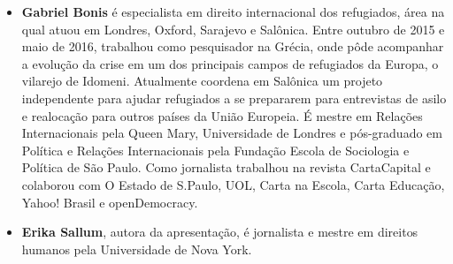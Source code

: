 \begin{itemize}


\item \textbf{Gabriel Bonis} 
  é especialista em direito internacional dos refugiados, área na
  qual atuou em Londres, Oxford, Sarajevo e Salônica. Entre outubro de 2015 e
  maio de 2016, trabalhou como pesquisador na Grécia, onde pôde acompanhar a evolução da crise
  em um dos principais campos de refugiados da Europa, o vilarejo de Idomeni.
  Atualmente coordena em Salônica um projeto independente para ajudar
  refugiados a se prepararem para entrevistas de asilo e realocação para outros
  países da União Europeia. É mestre em Relações Internacionais pela Queen
  Mary, Universidade de Londres e pós-graduado em Política e Relações
  Internacionais pela Fundação Escola de Sociologia e Política de São Paulo.
  Como jornalista trabalhou na revista CartaCapital e colaborou com O Estado de
  S.Paulo, UOL, Carta na Escola, Carta Educação, Yahoo! Brasil e openDemocracy.
  
\item \textbf{Erika Sallum}, autora da apresentação, é jornalista e mestre em direitos humanos pela Universidade de Nova York. 
\end{itemize}

